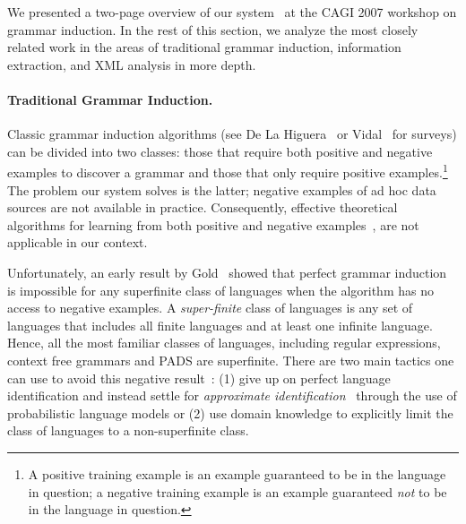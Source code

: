 \noindent
We presented a two-page overview of our system~\cite{burke+:cagi07} at
the CAGI 2007 workshop on grammar induction. 
In the rest of this section, we analyze
the most closely related work in the areas of
traditional grammar induction, information extraction, and XML analysis
in more depth.

\paragraph*{Traditional Grammar Induction.}
Classic grammar induction algorithms (see De La
Higuera~\cite{higuera01current} or Vidal~\cite{vidal:gisurvey} for
surveys) can be divided into two classes: those that require both
positive and negative examples to discover a grammar and those that
only require positive examples.\footnote{A positive training example
is an example guaranteed to be in the language in question; a negative
training example is an example guaranteed {\em not} to be in the
language in question.}  The problem our system solves is the latter;
negative examples of ad hoc data sources are not available in
practice.  Consequently, effective theoretical algorithms for learning
from both positive and negative
examples~\cite{denis:learning-regular-languages,lemay+:tree-transducers,rpni,raeymaekers+:learning-tree-languages},
are not applicable in our context.

Unfortunately, an early result by Gold~\cite{gold:inference} showed
that perfect grammar induction is impossible for any superfinite class
of languages when the algorithm has no access to negative examples.  A
{\em super-finite} class of languages is any set of languages that
includes all finite languages and at least one infinite
language. Hence, all the most familiar classes of languages, including
regular expressions, context free grammars and PADS are superfinite.
There are two main tactics one can use to avoid this negative
result~\cite{vidal:gisurvey}: 
(1) give up on perfect language identification and instead settle for {\em approximate
identification}~\cite{wharton:approximate-language-identification}
through the use of probabilistic language models or 
(2) use domain knowledge to explicitly limit the class of languages to a
non-superfinite class.

